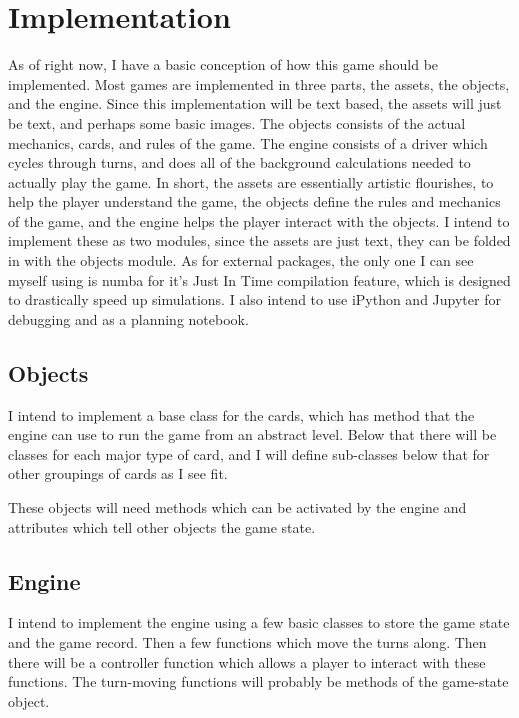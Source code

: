 \documentclass[10pt,letterpaper, twocolumn, science]{revtex4}
\begin{document}
\section{Implementation}

As of right now, I have a basic conception of how this game should be implemented. Most games are implemented in three parts, the assets, the objects, and the engine. Since this implementation will be text based, the assets will just be text, and perhaps some basic images. The objects consists of the actual mechanics, cards, and rules of the game. The engine consists of a driver which cycles through turns, and does all of the background calculations needed to actually play the game. In short, the assets are essentially artistic flourishes, to help the player understand the game, the objects define the rules and mechanics of the game, and the engine helps the player interact with the objects. I intend to implement these as two modules, since the assets are just text, they can be folded in with the objects module. As for external packages, the only one I can see myself using is numba\cite{numba} for it's Just In Time compilation feature, which is designed to drastically speed up simulations. I also intend to use iPython and Jupyter for debugging and as a planning notebook.

\subsection{Objects}
I intend to implement a base class for the cards, which has method that the engine can use to run the game from an abstract level. Below that there will be classes for each major type of card, and I will define sub-classes below that for other groupings of cards as I see fit.

These objects will need methods which can be activated by the engine and attributes which tell other objects the game state.


\subsection{Engine}

I intend to implement the engine using a few basic classes to store the game state and the game record. Then a few functions which move the turns along. Then there will be a controller function which allows a player to interact with these functions. The turn-moving functions will probably be methods of the game-state object.
\end{document}
